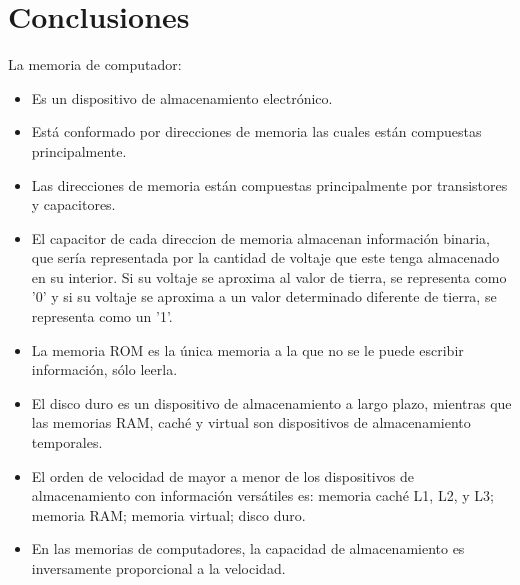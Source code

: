 \documentclass{article}
\begin{document}


\section{Conclusiones} \label{conclulsion}

La memoria de computador:
    \begin{itemize}
        \item
            Es un dispositivo de almacenamiento electrónico.
        \item 
            Está conformado por direcciones de memoria las cuales están compuestas principalmente.
            
            
            
            
        \item 
            Las direcciones de memoria están compuestas principalmente por transistores y capacitores.
        \item 
             El capacitor de cada direccion de memoria almacenan información binaria, que sería representada por la cantidad de voltaje que este tenga almacenado en su interior. Si su voltaje se aproxima al valor de tierra, se representa como '0' y si su voltaje se aproxima a un valor determinado diferente de tierra, se representa como un '1'.
             
        \item
            La memoria ROM es la única memoria a la que no se le puede escribir información, sólo leerla.
             
            
        \item
            El disco duro es un dispositivo de almacenamiento a largo plazo, mientras que las memorias RAM, caché y virtual son dispositivos de almacenamiento temporales.             
             
             
        \item
            El orden de velocidad de mayor a menor de los dispositivos de almacenamiento con información versátiles es: memoria caché L1, L2, y L3; memoria RAM; memoria virtual; disco duro.
            
            
        \item
            En las memorias de computadores, la capacidad de almacenamiento es inversamente proporcional a la velocidad.
            

\end{itemize}
\end{document}
